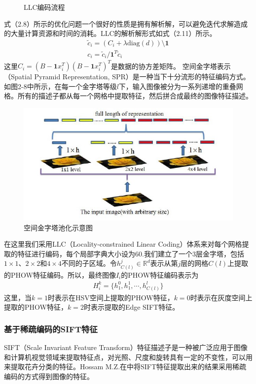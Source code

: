 \documentclass[supercite]{HustGraduPaper}
\begin{document}
\begin{sloppypar}
\begin{figure}[H]
      \caption{LLC编码流程}
    \end{figure}
  式（2.8）所示的优化问题一个很好的性质是拥有解析解，可以避免迭代求解造成的大量计算资源和时间的消耗。LLC的解析解形式如式（2.11）所示。\begin{gather}
   \tilde{c}_i=(C_i+\lambda\text{diag}(d))\setminus\mathbf{1}\\
   c_i=\tilde{c}_i/\mathbf{1}^T\tilde{c}_i
  \end{gather}
  这里$C_i=(B-\mathbf{1}x_i^T)(B-\mathbf{1}x_i^T)^T$是数据的协方差矩阵。
  空间金字塔表示（Spatial Pyramid Representation, SPR）是一种当下十分流形的特征编码方式。如图2-8中所示，在每一个金字塔等级$l$下，输入图像被分为一系列递增的重叠网格。所有的描述子都从每一个网格中提取特征，然后拼合成最终的图像特征描述。
  \begin{figure}[H]
    \setlength{\abovecaptionskip}{0.2cm}
    \setlength{\belowcaptionskip}{-0.cm}
      \centering%
      \includegraphics[scale=0.8]{10.jpg}
      \caption{空间金字塔池化示意图}
    \end{figure}
  
  在这里我们采用LLC（Locality-constrained Linear Coding）体系来对每个网格提取的特征进行编码，每个局部字典大小设为60.我们建立了一个3层金字塔，包括$1\times1$、$2\times2$和$4\times4$不同的子区域。令$h^j_{C(l)}\in \mathbb{R}^d$表示从第$j$层的网格$C(l)$上提取的PHOW特征编码。所以，最终图像$I_i$的PHOW特征编码表示为\begin{gather}
   H^k_i=\{ h^0_1,h^1_1,\cdots,h^l_{C(l)} \}
  \end{gather}
  这里，当$k=1$时表示在HSV空间上提取的PHOW特征，$k=0$时表示在灰度空间上提取的PHOW特征，$k=2$时表示提取的Edge SIFT特征。
  \subsubsection{基于稀疏编码的SIFT特征}
  SIFT（Scale Invariant Feature Transform）特征描述子是一种被广泛应用于图像和计算机视觉领域来提取特征点，对光照、尺度和旋转具有一定的不变性，可以用来提取花卉分类的特征。Hossam M.Z.在\cite{6968612}中将SIFT特征提取出来的结果采用稀疏编码的方式得到图像的特征。


\end{sloppypar}
\end{document}
